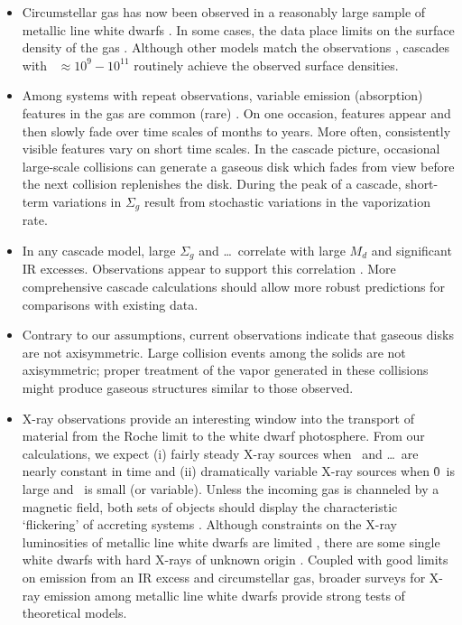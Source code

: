 \documentclass[12pt,preprint]{aastex}
\begin{document}
\begin{itemize}

\item Circumstellar gas has now been observed in a reasonably large sample of
metallic line white dwarfs \citep[e.g.][]{gansicke2006,gansicke2007,gansicke2008,
melis2010b,farihi2012,melis2012a,debes2012b,wilson2014,manser2016a,hartmann2016,
manser2016b,xu2016,li2017,redfield2017,melis2017}. In some cases, the data place
limits on the surface density of the gas \citep{hartmann2016}. Although other 
models match the observations \citep[e.g.,][]{metzger2012}, cascades with 
\mdotz\ $\approx 10^9 - 10^{11}$ routinely achieve the observed surface densities.

\item Among systems with repeat observations, variable emission (absorption) features 
in the gas are common (rare) \citep[e.g.,][and references therein]{wilson2014,
manser2016a,manser2016b,redfield2017,melis2017}. On one occasion, features appear and 
then slowly fade over time scales of months to years.  More often, consistently visible 
features vary on short time scales. In the cascade picture, occasional large-scale 
collisions can generate a gaseous disk which fades from view before the next collision 
replenishes the disk. During the peak of a cascade, short-term variations in $\Sigma_g$ 
result from stochastic variations in the vaporization rate.

\item In any cascade model, large $\Sigma_g$ and \mdots\ correlate with large $M_d$
and significant IR excesses. Observations appear to support this correlation
\citep[e.g.,][]{manser2016b}. More comprehensive cascade calculations should allow
more robust predictions for comparisons with existing data.

\item Contrary to our assumptions, current observations indicate that gaseous disks 
are not axisymmetric. Large collision events among the solids are not axisymmetric;
proper treatment of the vapor generated in these collisions might produce gaseous
structures similar to those observed.

\item X-ray observations provide an interesting window into the transport of material 
from the Roche limit to the white dwarf photosphere.  From our calculations, we expect 
(i) fairly steady X-ray sources when \mdotv\ and \mdots\ are nearly constant in time 
and (ii) dramatically variable X-ray sources when \r0\ is large and \mdotz\ is small 
(or variable). Unless the incoming gas is channeled by a magnetic field, both sets of 
objects should display the characteristic `flickering' of accreting systems 
\citep[e.g.,][]{sokoloski2003,maoz2015}. Although constraints on the X-ray luminosities 
of metallic line white dwarfs are limited \citep[e.g.,][and references 
therein]{farihi2017b,rappaport2017}, there are some single white dwarfs with 
hard X-rays of unknown origin \citep[e.g.,][]{chu2004,bilikova2010}. Coupled with 
good limits on emission from an IR excess and circumstellar gas, broader surveys for 
X-ray emission among metallic line white dwarfs provide strong tests of theoretical models.


\end{itemize}
\end{document}
